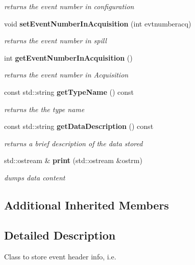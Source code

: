 \begin{DoxyCompactItemize}
\begin{DoxyCompactList}\small\item\em returns the event number in configuration \end{DoxyCompactList}\item 
void {\bf set\-Event\-Number\-In\-Acquisition} (int evtnumberacq)
\begin{DoxyCompactList}\small\item\em returns the event number in spill \end{DoxyCompactList}\item 
int {\bf get\-Event\-Number\-In\-Acquisition} ()\label{classCALICE_1_1EventHeader_aeb2022e92de4b7cc8a28912ccdd52f73}

\begin{DoxyCompactList}\small\item\em returns the event number in Acquisition \end{DoxyCompactList}\item 
const std\-::string {\bf get\-Type\-Name} () const \label{classCALICE_1_1EventHeader_a2db92906b475b2c6409c24535a00d7a6}

\begin{DoxyCompactList}\small\item\em returns the the type name \end{DoxyCompactList}\item 
const std\-::string {\bf get\-Data\-Description} () const \label{classCALICE_1_1EventHeader_a52adc9cbf4000c04b5431406f8df1d83}

\begin{DoxyCompactList}\small\item\em returns a brief description of the data stored \end{DoxyCompactList}\item 
std\-::ostream \& {\bf print} (std\-::ostream \&ostrm)\label{classCALICE_1_1EventHeader_a1067ef9c5904eb8aa9f1438136c1b5de}

\begin{DoxyCompactList}\small\item\em dumps data content \end{DoxyCompactList}\end{DoxyCompactItemize}
\subsection*{Additional Inherited Members}


\subsection{Detailed Description}
Class to store event header info, i.\-e. 

